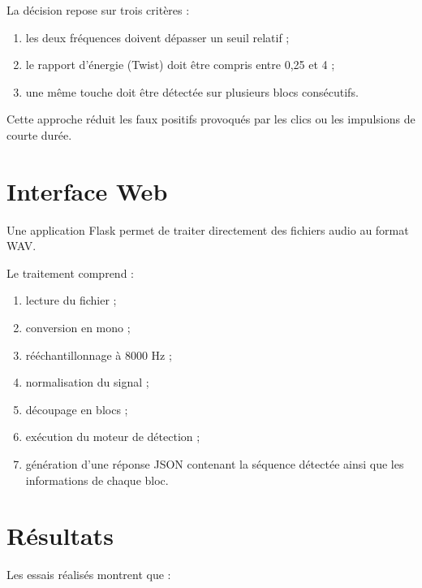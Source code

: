 \documentclass[12pt,a4paper]{article}
\begin{document}
La décision repose sur trois critères :

\begin{enumerate}

\item les deux fréquences doivent dépasser un seuil relatif ;

\item le rapport d'énergie (Twist) doit être compris entre 0,25 et 4 ;

\item une même touche doit être détectée sur plusieurs blocs consécutifs.

\end{enumerate}

Cette approche réduit les faux positifs provoqués par les clics ou les impulsions de courte durée.

\section{Interface Web}

Une application Flask permet de traiter directement des fichiers audio au format WAV.

Le traitement comprend :

\begin{enumerate}

\item lecture du fichier ;

\item conversion en mono ;

\item rééchantillonnage à 8000 Hz ;

\item normalisation du signal ;

\item découpage en blocs ;

\item exécution du moteur de détection ;

\item génération d'une réponse JSON contenant la séquence détectée ainsi que les informations de chaque bloc.

\end{enumerate}

\section{Résultats}

Les essais réalisés montrent que :
\end{document}
